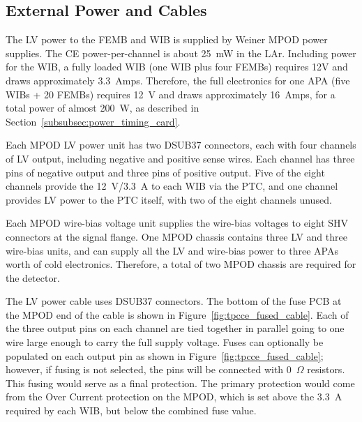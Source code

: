 %
\subsection{External Power and Cables}
\label{subsec:ce_feedthrough_power}

The LV power to the FEMB and WIB is supplied by Weiner MPOD power supplies. 
The CE power-per-channel is about 25~mW in the LAr.
Including power for the WIB, a fully loaded WIB (one WIB plus four FEMBs) requires
12V and draws approximately 3.3~Amps. Therefore, the full electronics for one APA (five WIBs + 20 FEMBs) 
requires 12~V and draws approximately 16~Amps, for a total power of almost 200~W, as 
described in Section~\ref{subsubsec:power_timing_card}.

Each MPOD LV power unit has two DSUB37 connectors, each with four channels of LV output, including negative
and positive sense wires. %
Each channel has three pins
of negative output and three pins of positive output. Five of the eight channels
provide the 12~V/3.3~A to each WIB via the PTC, and one channel provides LV power 
to the PTC itself, with two of the eight channels unused.


Each MPOD wire-bias voltage unit supplies the wire-bias voltages to eight SHV connectors 
at the signal flange. One MPOD chassis contains three LV and three wire-bias units, and can
supply all the LV and wire-bias power to three APAs worth of cold electronics. Therefore,
a total of two MPOD chassis are required for the detector.


The LV power cable uses DSUB37 connectors. The bottom of the fuse PCB at the MPOD 
end of the cable is shown in Figure~\ref{fig:tpcce_fused_cable}. Each of the three output pins on
each channel are tied together in parallel 
going to one wire large enough to carry the full supply voltage. Fuses can optionally be 
populated on each output pin as shown in Figure~\ref{fig:tpcce_fused_cable}; however, if
fusing is not selected, the pins will be connected with 0~$\Omega$ resistors. This fusing would serve as
a final protection. The primary protection would come from the Over Current protection
on the MPOD, which is set above the 3.3~A required by each WIB, but below the
combined fuse value.

